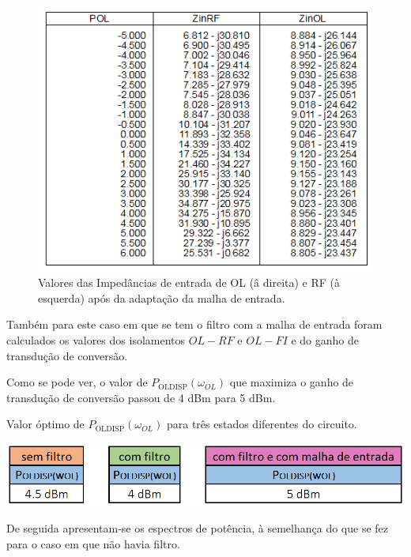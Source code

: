 \documentclass[11pt]{article}
\numberwithin{equation}{section}
\begin{document}
\begin{figure}[h]
\centering
\includegraphics[keepaspectratio=true, scale=0.46]{exps/Z_21}
\vspace{-0.5em}
\caption{Valores das Impedâncias de entrada de OL (â direita) e RF (à esquerda) após da adaptação da malha de entrada.}
\vspace{-0.8em}
\label{fig:Imp_OL_RF_21}
\end{figure}

Também para este caso em que se tem o filtro com a malha de entrada foram calculados os valores dos isolamentos $OL - RF$ e $OL - FI$ e do ganho de transdução de conversão.

Como se pode ver, o valor de $ P_{\text{OLDISP}}\left(\omega_{OL}\right) $ que maximiza o ganho de transdução de conversão passou de 4 dBm para 5 dBm.

\begin{table}[h]
	\centering
	\caption{Valor óptimo de $ P_{\text{OLDISP}}\left(\omega_{OL}\right) $ para três estados diferentes do circuito.}
	\vspace{-1.5mm}
	\includegraphics[keepaspectratio=true, scale=0.45]{teoricas/poldispSemComFiltroMalha}
\end{table}

De seguida apresentam-se os espectros de potência, à semelhança do que se fez para o caso em que não havia filtro.
\end{document}
